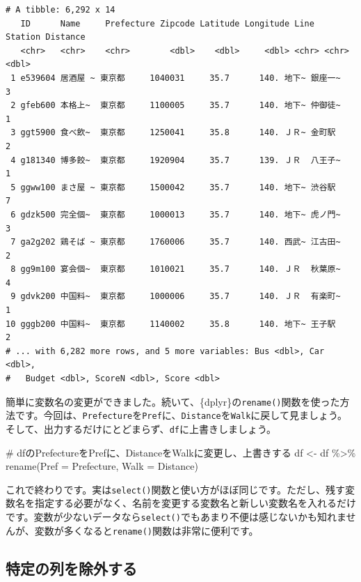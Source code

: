 \documentclass[
  a4paper,
  pandoc,
  ja=standard,
  jafont=haranoaji]{bxjsbook}
\newenvironment{Shaded}{\begin{snugshade}}{\end{snugshade}}
\newcommand{\AttributeTok}[1]{\textcolor[rgb]{0.00,0.48,0.65}{#1}}
\newcommand{\CommentTok}[1]{\textcolor[rgb]{0.37,0.37,0.37}{#1}}
\newcommand{\FunctionTok}[1]{\textcolor[rgb]{0.28,0.35,0.67}{#1}}
\newcommand{\NormalTok}[1]{\textcolor[rgb]{0.00,0.48,0.65}{#1}}
\newcommand{\OtherTok}[1]{\textcolor[rgb]{0.00,0.48,0.65}{#1}}
\newcommand{\SpecialCharTok}[1]{\textcolor[rgb]{0.37,0.37,0.37}{#1}}
\begin{document}
\begin{verbatim}
# A tibble: 6,292 x 14
   ID      Name     Prefecture Zipcode Latitude Longitude Line  Station Distance
   <chr>   <chr>    <chr>        <dbl>    <dbl>     <dbl> <chr> <chr>      <dbl>
 1 e539604 居酒屋 ~ 東京都     1040031     35.7      140. 地下~ 銀座一~        3
 2 gfeb600 本格上~  東京都     1100005     35.7      140. 地下~ 仲御徒~        1
 3 ggt5900 食べ飲~  東京都     1250041     35.8      140. ＪＲ~ 金町駅         2
 4 g181340 博多餃~  東京都     1920904     35.7      139. ＪＲ  八王子~        1
 5 ggww100 まさ屋 ~ 東京都     1500042     35.7      140. 地下~ 渋谷駅         7
 6 gdzk500 完全個~  東京都     1000013     35.7      140. 地下~ 虎ノ門~        3
 7 ga2g202 鶏そば ~ 東京都     1760006     35.7      140. 西武~ 江古田~        2
 8 gg9m100 宴会個~  東京都     1010021     35.7      140. ＪＲ  秋葉原~        4
 9 gdvk200 中国料~  東京都     1000006     35.7      140. ＪＲ  有楽町~        1
10 gggb200 中国料~  東京都     1140002     35.8      140. 地下~ 王子駅         2
# ... with 6,282 more rows, and 5 more variables: Bus <dbl>, Car <dbl>,
#   Budget <dbl>, ScoreN <dbl>, Score <dbl>
\end{verbatim}

簡単に変数名の変更ができました。続いて、\{dplyr\}の\texttt{rename()}関数を使った方法です。今回は、\texttt{Prefecture}を\texttt{Pref}に、\texttt{Distance}を\texttt{Walk}に戻して見ましょう。そして、出力するだけにとどまらず、\texttt{df}に上書きしましょう。

\begin{Shaded}
\begin{Highlighting}[numbers=left,,]
\CommentTok{\# dfのPrefectureをPrefに、DistanceをWalkに変更し、上書きする}
\NormalTok{df }\OtherTok{\textless{}{-}}\NormalTok{ df }\SpecialCharTok{\%\textgreater{}\%}
  \FunctionTok{rename}\NormalTok{(}\AttributeTok{Pref =}\NormalTok{ Prefecture, }\AttributeTok{Walk =}\NormalTok{ Distance)}
\end{Highlighting}
\end{Shaded}

これで終わりです。実は\texttt{select()}関数と使い方がほぼ同じです。ただし、残す変数名を指定する必要がなく、名前を変更する変数名と新しい変数名を入れるだけです。変数が少ないデータなら\texttt{select()}でもあまり不便は感じないかも知れませんが、変数が多くなると\texttt{rename()}関数は非常に便利です。

\hypertarget{ux7279ux5b9aux306eux5217ux3092ux9664ux5916ux3059ux308b}{%
\subsection{特定の列を除外する}\label{ux7279ux5b9aux306eux5217ux3092ux9664ux5916ux3059ux308b}}
\end{document}
